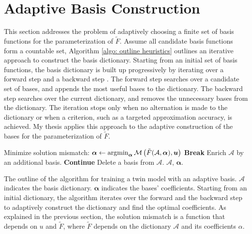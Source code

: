 \section{Adaptive Basis Construction}
\label{sec: adaptive basis}
This section addresses the problem of adaptively choosing a finite set of basis functions
for the parameterization of $\tilde{F}$.
Assume all candidate basis functions form a countable set,
Algorithm \ref{algo: outline heuristics} outlines an iterative approach 
to construct the basis dictionary.
Starting from an initial set of basis functions,
the basis dictionary is built up progressively 
by iterating over a forward step and a backward step
\cite{adaptive basis 1, adaptive basis 2, adaptive basis 3}.
The forward step searches over a candidate set of bases, and appends the most useful bases 
to the dictionary.
The backward step searches over the current dictionary, and removes the 
unnecessary bases from the dictionary.
The iteration stops only when no alternation is made to the dictionary or when a criterion, such
as a targeted approximation accuracy,
is achieved. My thesis applies 
this approach to the adaptive construction of the bases for the parameterization of $\tilde{F}$.\\

\begin{algorithm}
    \begin{algorithmic}[1]
        \LOOP
            \STATE Minimize solution mismatch:
                   $\boldsymbol{\alpha} \leftarrow \operatorname*{\arg\!\min}_{\boldsymbol{\alpha}} \mathcal{M}
                    \left( \tilde{F}(\mathcal{A}, \boldsymbol{\alpha}), \boldsymbol{u}\right)$
                \STATE \textbf{Break}
            \ELSE
                \STATE Enrich $\mathcal{A}$ by an additional basis.
            \ENDIF
                \STATE \textbf{Continue}
            \ELSE 
                \STATE Delete a basis from $\mathcal{A}$.
            \ENDIF
        \ENDLOOP
        \ENSURE $\mathcal{A}$, $\boldsymbol{\alpha}$.
    \end{algorithmic}
    \caption{The outline of the algorithm for training a twin model with an adaptive basis.
             $\mathcal{A}$ indicates the basis dictionary.  
             $\boldsymbol{\alpha}$ indicates the bases' coefficients.
             Starting from an initial dictionary, the algorithm iterates over the forward and
             the backward step to adaptively construct the dictionary and find the optimal 
             coefficients.
             As explained in the previous section, the solution mismatch is a function that depends
             on $u$ and $\tilde{F}$, where $\tilde{F}$ depends on the dictionary $\mathcal{A}$
             and its coefficients $\alpha$.} 
    \label{algo: outline heuristics}
\end{algorithm}


